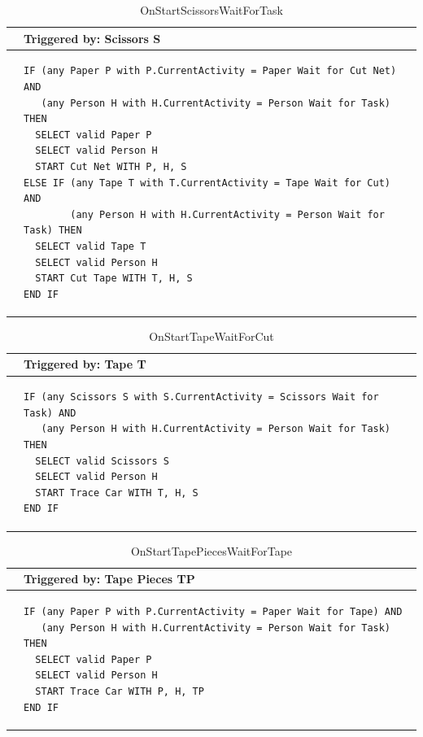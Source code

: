 \documentclass[
  10pt,
  a4paperpaper,
  DIV=11,
  numbers=noendperiod,
  oneside]{scrreprt}
\begin{document}
\begin{longtable}{@{}>{\raggedright\arraybackslash}p{0.25cm}>{\raggedright\arraybackslash}p{13cm}@{}}

\caption{\label{tbl-start_scissors_wait_task}OnStartScissorsWaitForTask}

\tabularnewline

  \toprule
   & Triggered by: Scissors S\\ \midrule 
  &
\begin{lstlisting}[language=CMPseudo]
IF (any Paper P with P.CurrentActivity = Paper Wait for Cut Net) AND
   (any Person H with H.CurrentActivity = Person Wait for Task) THEN
  SELECT valid Paper P
  SELECT valid Person H
  START Cut Net WITH P, H, S
ELSE IF (any Tape T with T.CurrentActivity = Tape Wait for Cut) AND
        (any Person H with H.CurrentActivity = Person Wait for Task) THEN
  SELECT valid Tape T
  SELECT valid Person H
  START Cut Tape WITH T, H, S
END IF
\end{lstlisting}
  \\ \bottomrule
  

\end{longtable}

\begin{longtable}{@{}>{\raggedright\arraybackslash}p{0.25cm}>{\raggedright\arraybackslash}p{13cm}@{}}

\caption{\label{tbl-start_tape_wait_cut}OnStartTapeWaitForCut}

\tabularnewline

  \toprule
   & Triggered by: Tape T\\ \midrule 
  &
\begin{lstlisting}[language=CMPseudo]
IF (any Scissors S with S.CurrentActivity = Scissors Wait for Task) AND
   (any Person H with H.CurrentActivity = Person Wait for Task) THEN
  SELECT valid Scissors S
  SELECT valid Person H
  START Trace Car WITH T, H, S
END IF
\end{lstlisting}
  \\ \bottomrule
  

\end{longtable}

\begin{longtable}{@{}>{\raggedright\arraybackslash}p{0.25cm}>{\raggedright\arraybackslash}p{13cm}@{}}

\caption{\label{tbl-start_tape_pieces_wait_tape}OnStartTapePiecesWaitForTape}

\tabularnewline

  \toprule
   & Triggered by: Tape Pieces TP\\ \midrule 
  &
\begin{lstlisting}[language=CMPseudo]
IF (any Paper P with P.CurrentActivity = Paper Wait for Tape) AND
   (any Person H with H.CurrentActivity = Person Wait for Task) THEN
  SELECT valid Paper P
  SELECT valid Person H
  START Trace Car WITH P, H, TP
END IF
\end{lstlisting}
  \\ \bottomrule
  

\end{longtable}
\end{document}
